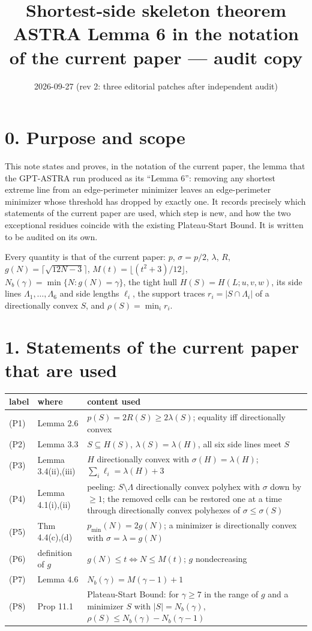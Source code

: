 \documentclass[11pt]{article}
\title{Shortest-side skeleton theorem\\[4pt]
\large ASTRA Lemma 6 in the notation of the current paper --- audit copy}
\author{}
\date{2026-09-27 (rev 2: three editorial patches after independent audit)}
\theoremstyle{plain}
\theoremstyle{remark}
\newcommand{\sm}{\setminus}
\begin{document}
\maketitle

\section*{0. Purpose and scope}

This note states and proves, in the notation of the current paper, the lemma that the
GPT-ASTRA run produced as its ``Lemma 6'': removing any shortest extreme line from an
edge-perimeter minimizer leaves an edge-perimeter minimizer whose threshold has dropped by
exactly one. It records precisely which statements of the current paper are used, which
step is new, and how the two exceptional residues coincide with the existing
Plateau-Start Bound. It is written to be audited on its own.

Every quantity is that of the current paper: \(p\), \(\sigma=p/2\), \(\lambda\), \(R\),
\(g(N)=\lceil\sqrt{12N-3}\rceil\), \(M(t)=\lfloor(t^{2}+3)/12\rfloor\),
\(N_{b}(\gamma)=\min\{N:g(N)=\gamma\}\), the tight hull \(H(S)=H(L;u,v,w)\), its side lines
\(\Lambda_{1},\dots,\Lambda_{6}\) and side lengths \(\ell_{i}\), the support traces
\(r_{i}=|S\cap\Lambda_{i}|\) of a directionally convex \(S\), and \(\rho(S)=\min_{i}r_{i}\).

\section*{1. Statements of the current paper that are used}

\begin{center}
\begin{tabular}{@{}llp{8.6cm}@{}}
\toprule
label & where & content used \\
\midrule
(P1) & Lemma 2.6 & \(p(S)=2R(S)\ge2\lambda(S)\); equality iff directionally convex \\
(P2) & Lemma 3.3 & \(S\subseteq H(S)\), \(\lambda(S)=\lambda(H)\), all six side lines meet \(S\) \\
(P3) & Lemma 3.4(ii),(iii) & \(H\) directionally convex with \(\sigma(H)=\lambda(H)\); \(\sum_{i}\ell_{i}=\lambda(H)+3\) \\
(P4) & Lemma 4.1(i),(ii) & peeling: \(S\sm\Lambda\) directionally convex polyhex with \(\sigma\) down by \(\ge1\); the removed cells can be restored one at a time through directionally convex polyhexes of \(\sigma\le\sigma(S)\) \\
(P5) & Thm 4.4(c),(d) & \(p_{\min}(N)=2g(N)\); a minimizer is directionally convex with \(\sigma=\lambda=g(N)\) \\
(P6) & definition of \(g\) & \(g(N)\le t\iff N\le M(t)\); \(g\) nondecreasing \\
(P7) & Lemma 4.6 & \(N_{b}(\gamma)=M(\gamma-1)+1\) \\
(P8) & Prop 11.1 & Plateau-Start Bound: for \(\gamma\ge7\) in the range of \(g\) and a minimizer \(S\) with \(|S|=N_{b}(\gamma)\), \(\rho(S)\le N_{b}(\gamma)-N_{b}(\gamma-1)\) \\
\bottomrule
\end{tabular}
\end{center}
\end{document}
